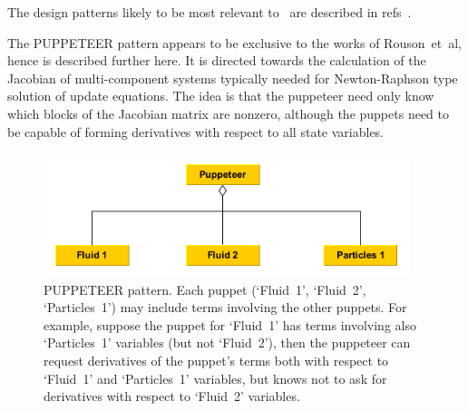 The design patterns likely to be most relevant to \nep \ are described
in refs~\cite{y2re332,y2re333}.

The PUPPETEER pattern appears to be
exclusive to the works of Rouson~et~al, hence is described further here.
It is directed towards the calculation of the Jacobian of multi-component
systems typically needed for Newton-Raphson type solution of update equations.
The idea is that the puppeteer need only know which blocks of the Jacobian
matrix are nonzero, although the puppets need to be capable of forming derivatives
with respect to all state variables.
\begin{figure}
\centerline{\includegraphics[width=0.95\textwidth]{./pics/puppeteer_wab.png}}
\caption{
PUPPETEER pattern. Each puppet (`Fluid~1', `Fluid~2', `Particles~1') may include terms  involving 
the other puppets. For example, suppose the puppet for `Fluid~1' has terms involving also `Particles~1'
variables (but not `Fluid~2'), then the puppeteer can request derivatives of the puppet's terms both
with respect to `Fluid~1' and `Particles~1' variables, but knows not to ask for derivatives with respect
to `Fluid~2' variables.
\label{fig:puppeteer_wab}}
\end{figure}
